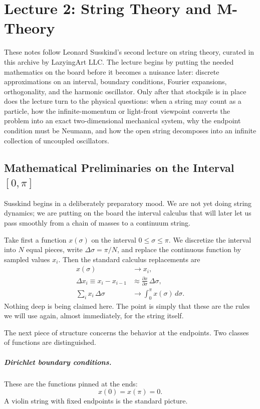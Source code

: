 \chapter{Lecture 2: String Theory and M-Theory}

These notes follow Leonard Susskind's second lecture on string theory, curated in this archive by LazyingArt LLC. The lecture begins by putting the needed mathematics on the board before it becomes a nuisance later: discrete approximations on an interval, boundary conditions, Fourier expansions, orthogonality, and the harmonic oscillator. Only after that stockpile is in place does the lecture turn to the physical questions: when a string may count as a particle, how the infinite-momentum or light-front viewpoint converts the problem into an exact two-dimensional mechanical system, why the endpoint condition must be Neumann, and how the open string decomposes into an infinite collection of uncoupled oscillators.

\section{Mathematical Preliminaries on the Interval $[0,\pi]$}

Susskind begins in a deliberately preparatory mood. We are not yet doing string dynamics; we are putting on the board the interval calculus that will later let us pass smoothly from a chain of masses to a continuum string.

Take first a function \(x(\sigma)\) on the interval \(0\leq \sigma \leq \pi\). We discretize the interval into \(N\) equal pieces, write \(\Delta \sigma=\pi/N\), and replace the continuous function by sampled values \(x_i\). Then the standard calculus replacements are
\begin{align}
x(\sigma) &\longrightarrow x_i, \\
\Delta x_i \equiv x_i-x_{i-1} &\approx \frac{\partial x}{\partial \sigma}\,\Delta \sigma, \\
\sum_i x_i\,\Delta \sigma &\longrightarrow \int_0^\pi x(\sigma)\,d\sigma .
\end{align}
Nothing deep is being claimed here. The point is simply that these are the rules we will use again, almost immediately, for the string itself.

The next piece of structure concerns the behavior at the endpoints. Two classes of functions are distinguished.

\paragraph{Dirichlet boundary conditions.}
These are the functions pinned at the ends:
\begin{equation}
x(0)=x(\pi)=0.
\end{equation}
A violin string with fixed endpoints is the standard picture.

